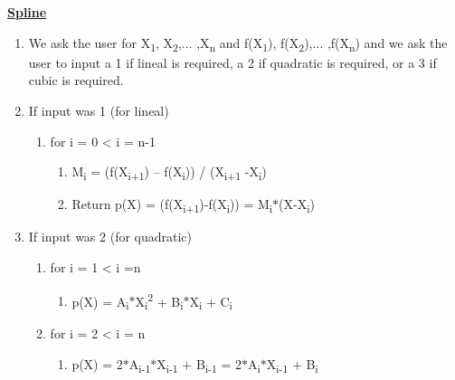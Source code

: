 \documentclass[12pt]{article}
\renewcommand{\_}{\kern-1.5pt\textunderscore\kern-1.5pt}
\begin{document}
\textbf{\uline{Spline}}\par

\begin{enumerate}
	\item We ask the user for X\textsubscript{1}, X\textsubscript{2},$ \ldots $ ,X\textsubscript{n} and f(X\textsubscript{1}), f(X\textsubscript{2}),$ \ldots $ ,f(X\textsubscript{n}) and we ask the user to input a 1 if lineal is required, a 2 if quadratic is required, or a 3 if cubic is required. \par

	\item If input was 1 (for lineal)\par

\begin{enumerate}
	\item for i = 0 < i = n-1\par

\begin{enumerate}
	\item M\textsubscript{i} = (f(X\textsubscript{i+1}) – f(X\textsubscript{i})) / (X\textsubscript{i+1 }-X\textsubscript{i})\par

	\item Return p(X) = (f(X\textsubscript{i+1})-f(X\textsubscript{i})) = M\textsubscript{i}$\ast$(X-X\textsubscript{i})\par


\end{enumerate}
\end{enumerate}
	\item If input was 2 (for quadratic)\par

\begin{enumerate}
	\item for i = 1 < i =n\par

\begin{enumerate}
	\item p(X) = A\textsubscript{i}$\ast$X\textsubscript{i}\textsuperscript{2} + B\textsubscript{i}$\ast$X\textsubscript{i} + C\textsubscript{i}\par


\end{enumerate}
	\item for i = 2 < i = n\par

\begin{enumerate}
	\item p(X)  = 2$\ast$A\textsubscript{i-1}$\ast$X\textsubscript{i-1 }+ B\textsubscript{i-1 }= 2$\ast$A\textsubscript{i}$\ast$X\textsubscript{i-1 }+ B\textsubscript{i}\par



\end{enumerate}
\end{enumerate}
\end{enumerate}
\end{document}
